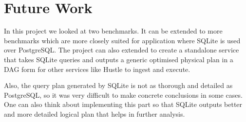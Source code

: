 \section{Future Work}
\label{sec:future}
In this project we looked at two benchmarks. It can be extended to more benchmarks which are more closely suited for application where SQLite is used over PostgreSQL. The project can also extended to create a standalone service that takes SQLite queries and outputs a generic optimised physical plan in a DAG form for other services like Hustle to ingest and execute. 

Also, the query plan generated by SQLite is not as thorough and detailed as PostgreSQL, so it was very difficult to make concrete conclusions in some cases. One can also think about implementing this part so that SQLite outputs better and more detailed logical plan that helps in further analysis.
